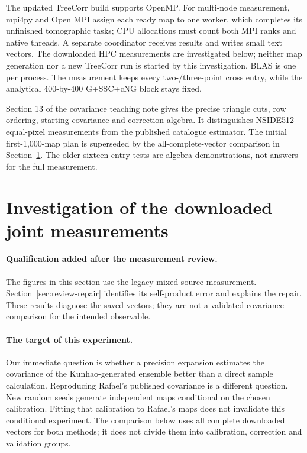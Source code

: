 \documentclass[11pt]{article}
\begin{document}
The updated TreeCorr build supports OpenMP. For multi-node measurement,
mpi4py and Open MPI assign each ready map to one worker, which completes
its unfinished tomographic tasks;
CPU allocations must count both MPI ranks and native threads. A separate
coordinator receives results and writes small text vectors. The downloaded HPC measurements are investigated below; neither map
generation nor a new TreeCorr run is started by this investigation.
BLAS is one per process. The measurement keeps every two-/three-point
cross entry, while the analytical 400-by-400 G+SSC+cNG block stays fixed.

Section 13 of the covariance teaching note gives the precise triangle cuts,
row ordering, starting covariance and correction algebra. It distinguishes
NSIDE512 equal-pixel measurements from the published catalogue estimator.
The initial first-1,000-map plan is superseded by the all-complete-vector
comparison in Section~\ref{sec:joint-audit}. The older sixteen-entry tests
are algebra demonstrations, not answers for the full measurement.

\section{Investigation of the downloaded joint measurements}
\label{sec:joint-audit}
\paragraph{Qualification added after the measurement review.}
The figures in this section use the legacy mixed-source measurement.
Section~\ref{sec:review-repair} identifies its self-product error and
explains the repair. These results diagnose the saved vectors; they are
not a validated covariance comparison for the intended observable.
\paragraph{The target of this experiment.}
Our immediate question is whether a precision expansion estimates the
covariance of the Kunhao-generated ensemble better than a direct sample
calculation. Reproducing Rafael's published covariance is a different
question. New random seeds generate independent maps conditional on the
chosen calibration. Fitting that calibration to Rafael's maps does not
invalidate this conditional experiment. The comparison below uses all
complete downloaded vectors for both methods; it does not divide them
into calibration, correction and validation groups.
\end{document}
